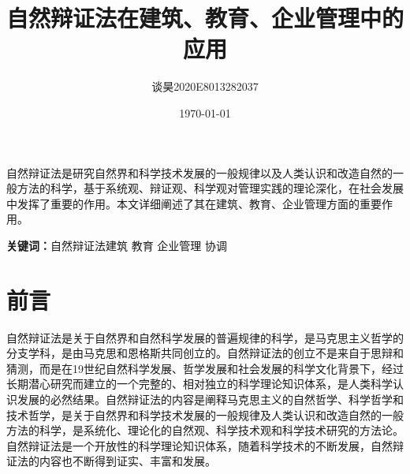 \documentclass[UTF8,a4paper]{ctexart}
\title{\bfseries 自然辩证法在建筑、教育、企业管理中的应用 }
\author{谈昊\quad2020E8013282037\quad217}
\date{\today}
\begin{document}
\maketitle


\begin{center}
\parbox{130mm}{
自然辩证法是研究自然界和科学技术发展的一般规律以及人类认识和改造自然的一般方法的科学，基于系统观、辩证观、科学观对管理实践的理论深化，在社会发展中发挥了重要的作用。本文详细阐述了其在建筑、教育、企业管理方面的重要作用。
\par
\vspace{1mm}
{\bfseries 关键词：}自然辩证法\quad 建筑 \quad 教育 \quad 企业管理 \quad 协调}
\end{center}



\section{前言}
自然辩证法是关于自然界和自然科学发展的普遍规律的科学，是马克思主义哲学的分支学科，是由马克思和恩格斯共同创立的。自然辩证法的创立不是来自于思辩和猜测，而是在19世纪自然科学发展、哲学发展和社会发展的科学文化背景下，经过长期潜心研究而建立的一个完整的、相对独立的科学理论知识体系，是人类科学认识发展的必然结果。自然辩证法的内容是阐释马克思主义的自然哲学、科学哲学和技术哲学，是关于自然界和科学技术发展的一般规律及人类认识和改造自然的一般方法的科学，是系统化、理论化的自然观、科学技术观和科学技术研究的方法论。自然辩证法是一个开放性的科学理论知识体系，随着科学技术的不断发展，自然辩证法的内容也不断得到证实、丰富和发展。\cite{RN14}
\end{document}
